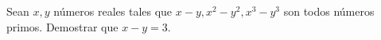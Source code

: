 Sean $x, y$ números reales tales que $x-y, x^2-y^2, x^3-y^3$ son todos números primos. Demostrar que $x-y=3$. 